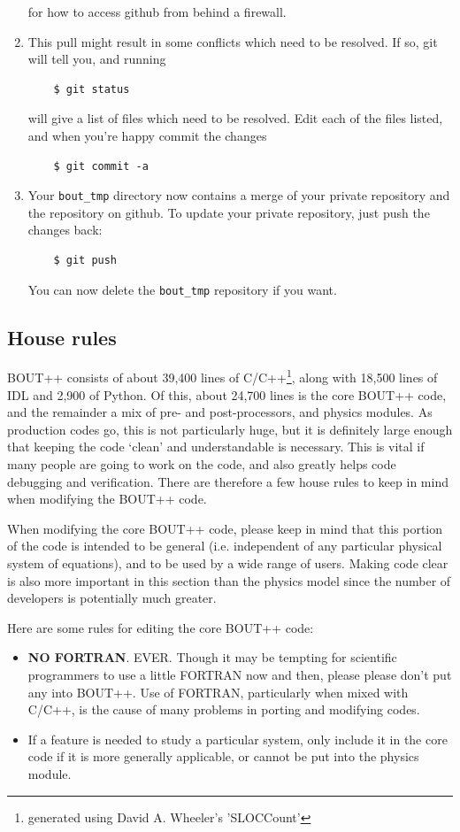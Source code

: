\documentclass[12pt]{article}
\begin{document}
\begin{enumerate}
  for how to access github from behind a firewall.
\item
  This pull might result in some conflicts which need to be resolved. If so, git will
  tell you, and running
  \begin{verbatim}
    $ git status
  \end{verbatim}
  will give a list of files which need to be resolved. Edit each of the files listed, and when you're happy 
  commit the changes
  \begin{verbatim}
    $ git commit -a
  \end{verbatim}
\item Your \texttt{bout\_tmp} directory now contains a merge of your private repository and the repository
  on github. To update your private repository, just push the changes back:
  \begin{verbatim}
    $ git push
  \end{verbatim}
  You can now delete the \texttt{bout\_tmp} repository if you want.
\end{enumerate}


\subsection{House rules}

BOUT++ consists of about 39,400 lines of C/C++\footnote{generated using
David A. Wheeler's 'SLOCCount'},
along with 18,500 lines of IDL and 2,900 of Python. Of this, about 24,700 lines is the core
BOUT++ code, and the remainder
a mix of pre- and post-processors, and physics modules. As production codes
go, this is not particularly huge, but it is definitely large enough that
keeping the code `clean' and understandable is necessary. This is vital
if many people are going to work on the code, and also greatly helps code
debugging and verification. There are therefore a few house rules to keep
in mind when modifying the BOUT++ code.

When modifying the core BOUT++ code, please keep in mind that this portion of the code
is intended to be general (i.e. independent of any particular physical system of equations),
and to be used by a wide range of users. Making code clear is also more important
in this section than the physics model since the number of developers is potentially
much greater. 

Here are some rules for editing the core BOUT++ code:
\begin{itemize}
\item {} {\bf NO FORTRAN}. EVER. Though it may be tempting for scientific programmers to use
a little FORTRAN now and then, please please don't put any into BOUT++. 
Use of FORTRAN, particularly when mixed with C/C++, is the cause of many problems in
porting and modifying codes. 
\item If a feature is needed to study a particular system, only include it in the
core code if it is more generally applicable, or cannot be put into the physics module.
\end{itemize}
\end{document}
